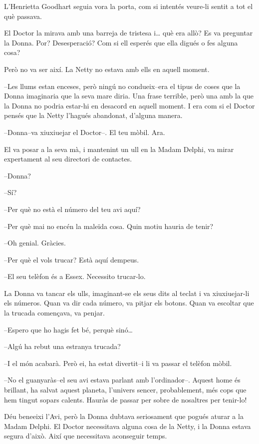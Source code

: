 L'Henrietta Goodhart seguia vora la porta, com si intentés veure-li
sentit a tot el què passava.

El Doctor la mirava amb una barreja de tristesa i\ldots{} què era allò?
Es va preguntar la Donna. Por? Desesperació? Com si ell esperés que ella
digués o fes alguna cosa?

Però no va ser així. La Netty no estava amb ells en aquell moment.

--Les llums estan enceses, però ningú no condueix--era el tipus de coses
que la Donna imaginaria que la seva mare diria. Una frase terrible, però
una amb la que la Donna no podria estar-hi en desacord en aquell moment.
I era com si el Doctor pensés que la Netty l'hagués abandonat, d'alguna
manera.

--Donna--va xiuxiuejar el Doctor--. El teu mòbil. Ara.

El va posar a la seva mà, i mantenint un ull en la Madam Delphi, va
mirar expertament al seu directori de contactes.

--Donna?

--Sí?

--Per què no està el número del teu avi aquí?

--Per què mai no encén la maleïda cosa. Quin motiu hauria de tenir?

--Oh genial. Gràcies.

--Per què el vols trucar? Està aquí dempeus.

--El seu telèfon és a Essex. Necessito trucar-lo.

La Donna va tancar els ulls, imaginant-se els seus dits al teclat i va
xiuxiuejar-li els números. Quan va dir cada número, va pitjar els
botons. Quan va escoltar que la trucada començava, va penjar.

--Espero que ho hagis fet bé, perquè sinó\ldots{}

--Algú ha rebut una estranya trucada?

--I el món acabarà. Però ei, ha estat divertit--i li va passar el
telèfon mòbil.

--No el guanyaràs--el seu avi estava parlant amb l'ordinador--. Aquest
home és brillant, ha salvat aquest planeta, l'univers sencer,
probablement, més cops que hem tingut sopars calents. Hauràs de passar
per sobre de nosaltres per tenir-lo!

Déu beneeixi l'Avi, però la Donna dubtava seriosament que pogués aturar
a la Madam Delphi. El Doctor necessitava alguna cosa de la Netty, i la
Donna estava segura d'això. Així que necessitava aconseguir temps.

